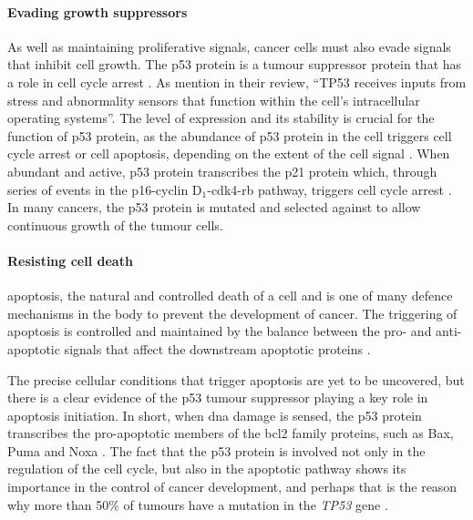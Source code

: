 \paragraph{Evading growth suppressors}

\noindent
As well as maintaining proliferative signals, cancer cells must also evade signals that inhibit cell growth.
The p53 protein is a tumour suppressor protein that has a  role in cell cycle arrest \citep{Hanahan2011,Levine1997}.
As \citet{Hanahan2011} mention in their review, ``TP53 receives inputs from stress and abnormality sensors that function within the cell's intracellular operating systems''.
The level of expression and its stability is crucial for the function of p53 protein, as the abundance of p53 protein in the cell triggers cell cycle arrest or cell \gls{apoptosis}, depending on the extent of the cell signal \citep{Fridman2003,Hanahan2011,Levine1997}.
When abundant and active, p53 protein transcribes the p21 protein which, through series of events in the p16-cyclin D$_1$-cdk4-\gls{rb} pathway, triggers cell cycle arrest \citep{Levine1997}.
In many cancers, the p53 protein is mutated and selected against to allow continuous growth of the tumour cells.

\paragraph{Resisting cell death}

\noindent
\Gls{apoptosis}, the natural and controlled death of a cell and is one of many defence mechanisms in the body to prevent the development of cancer.
The triggering of \gls{apoptosis} is controlled and maintained by the balance between the pro- and anti-apoptotic signals that affect the downstream apoptotic proteins \citep{Hanahan2011}.

The precise cellular conditions that trigger apoptosis are yet to be uncovered, but there is a clear evidence of the p53 tumour suppressor playing a key role in apoptosis initiation.
In short, when \acrshort{dna} damage is sensed, the p53 protein transcribes the pro-apoptotic members of the \gls{bcl2} family proteins, such as Bax, Puma and Noxa \citep{Fridman2003,Hanahan2011}.
The fact that the p53 protein is involved not only in the regulation of the cell cycle, but also in the apoptotic pathway shows its importance in the control of cancer development, and perhaps that is the reason why more than 50\% of tumours have a mutation in the \textit{TP53} gene \citep{Levine1997}.

